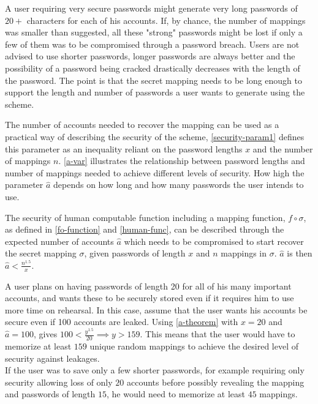 \par A user requiring very secure passwords might generate very long passwords of $20+$ characters for each of his accounts. If, by chance, the number of mappings was smaller than suggested, all these "strong" passwords might be lost if only a few of them was to be compromised through a password breach. Users are not advised to use shorter passwords, longer passwords are always better and the possibility of a password being cracked drastically decreases with the length of the password. The point is that the secret mapping needs to be long enough to support the length and number of passwords a user wants to generate using the scheme.

\par The number of accounts needed to recover the mapping can be used as a practical way of describing the security of the scheme, \autoref{security-param1} defines this parameter as an inequality reliant on the password lengths $x$ and the number of mappings $n$. \autoref{a-var} illustrates the relationship between password lengths and number of mappings needed to achieve different levels of security. How high the parameter $\hat a$ depends on how long and how many passwords the user intends to use. 


\begin{observation}
    \label{security-param1}
    The security of human computable function including a mapping function, $f \circ \sigma$, as defined in \autoref{fo-function} and \autoref{human-func}, can be described through the expected number of accounts $\hat a$ which needs to be compromised to start recover the secret mapping $\sigma$, given passwords of length $x$ and $n$ mappings in $\sigma$. $\hat a$ is then 
    $ \hat a < \frac{n^{ 1.5 }}{x} $.
    \label{a-theorem}
\end{observation}

\begin{example}
    A user plans on having passwords of length 20 for all of his many important accounts, and wants these to be securely stored even if it requires him to use more time on rehearsal. In this case, assume that the user wants his accounts be secure even if 100 accounts are leaked. Using \autoref{a-theorem} with $x=20$ and $\hat a = 100$, gives $100 < \frac{y^{1.5}}{20} \implies y > 159$. This means that the user would have to memorize at least $159$ unique random mappings to achieve the desired level of security against leakages. \\
    If the user was to save only a few shorter passwords, for example requiring only security allowing loss of only $20$ accounts before possibly revealing the mapping and passwords of length $15$, he would need to memorize at least $45$ mappings. 
\end{example}

